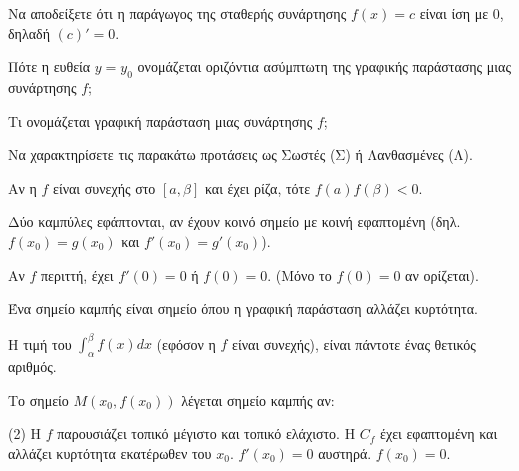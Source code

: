\documentclass[11pt,a4paper]{article}
\newcommand{\kerkissans}[1]{{\fontfamily{maksf}\selectfont \textbf{#1}}}
\renewcommand{\textdexiakeraia}{}
\newcommand{\dint}{\displaystyle\int}
\newcommand\themanum{A}
\newcounter{thema}[section]
\renewcommand{\thethema}{\arabic{thema}}
\newcommand{\Thema}{\refstepcounter{thema}{\textbf{\textcolor{black}{\faPenSquare\ \  \large \kerkissans{\textbf{\thethemaο\hspace{2mm}Διαγώνισμα - Θέμα \themanum}}}}}\hspace{0mm}}{}
\newenvironment{thema}[1]
{\begin{tcolorbox}[title=\Thema\kerkissans{\textbf{\large{  #1}}},breakable,
enhanced standard,titlerule=0pt,toprule=0pt, rightrule=0pt, bottomrule=0pt,
colback=white,left=0mm,top=1mm,bottom=0mm,
boxrule=0pt,
colframe=white,leftrule=0mm,sharp corners,coltitle=black]
\renewcommand{\themanum}{#1}}
{\end{tcolorbox}}
\begin{document}
\begin{thema}{A}
\begin{erwthma}
    \item Να αποδείξετε ότι η παράγωγος της σταθερής συνάρτησης $f(x) = c$ είναι ίση με $0$, δηλαδή $(c)' = 0$.
    \item Πότε η ευθεία $y=y_0$ ονομάζεται οριζόντια ασύμπτωτη της γραφικής παράστασης μιας συνάρτησης $f$;
    \item Τι ονομάζεται γραφική παράσταση μιας συνάρτησης $f$;
    \item Να χαρακτηρίσετε τις παρακάτω προτάσεις ως Σωστές (Σ) ή Λανθασμένες (Λ).
    \begin{alist}
        \item Αν η $f$ είναι συνεχής στο $[a, \beta]$ και έχει ρίζα, τότε $f(a)f(\beta) < 0$.
        \item Δύο καμπύλες εφάπτονται, αν έχουν κοινό σημείο με κοινή εφαπτομένη (δηλ. $f(x_0)=g(x_0)$ και $f'(x_0)=g'(x_0)$).
        \item Αν $f$ περιττή, έχει $f'(0)=0$ ή $f(0)=0$. (Μόνο το $f(0)=0$ αν ορίζεται).
        \item Ένα σημείο καμπής είναι σημείο όπου η γραφική παράσταση αλλάζει κυρτότητα.
        \item Η τιμή του $\dint_{\alpha}^{\beta} f(x) dx$ (εφόσον η $f$ είναι συνεχής), είναι πάντοτε ένας θετικός αριθμός.
    \end{alist}
    \item Το σημείο $M(x_0, f(x_0))$ λέγεται σημείο καμπής αν:
    \begin{tasks}[label=\let\textdexiakeraia\relax\alph*.](2)
        \task H $f$ παρουσιάζει τοπικό μέγιστο και τοπικό ελάχιστο.
        \task H $C_f$ έχει εφαπτομένη και αλλάζει κυρτότητα εκατέρωθεν του $x_0$.
        \task $f'(x_0) = 0$ αυστηρά.
        \task $f(x_0) = 0$.
    \end{tasks}
\end{erwthma}
\end{thema}
\vspace{1cm}
\end{document}
